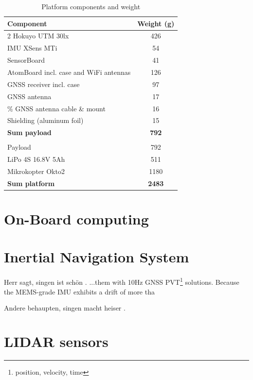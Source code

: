 \begin{table}[t]
\caption{Platform components and weight}
\label{table_platform_weight}
\begin{center}
\begin{tabular}{l|c}
  \textbf{Component} & \textbf{Weight (g)} \\
  \hline
  2 Hokuyo UTM 30lx & 426 \\
  IMU XSens MTi & 54 \\
  SensorBoard  & 41 \\
  AtomBoard incl. case and WiFi antennas & 126 \\
  GNSS receiver incl. case & 97 \\
  GNSS antenna & 17 \\
\% GNSS antenna cable \& mount & 16 \\
  Shielding (aluminum foil) & 15 \\ \hline
  \textbf{Sum payload} & \textbf{792} \\
  \\

  Payload & 792 \\
  LiPo 4S 16.8V 5Ah & 511 \\
  Mikrokopter Okto2 & 1180 \\ \hline
  \textbf{Sum platform} & \textbf{2483} \\
\end{tabular}
\end{center}
\end{table}

\section{On-Board computing}
\label{section_experimental_platform_hardware_computers}

\section{Inertial Navigation System}
\label{section_experimental_platform_hardware_ins}

Herr \textcite[vgl.][12]{wolf2012} sagt, singen ist schön \parencite[9]{wolf2012}.
...them with 10Hz GNSS PVT\footnote{position, velocity, time} solutions. Because the MEMS-grade IMU exhibits a drift of more tha

Andere behaupten, singen macht heiser \parencite{engert-timmermann2012}.

\section{LIDAR sensors}
\label{section_experimental_platform_hardware_lidar}



